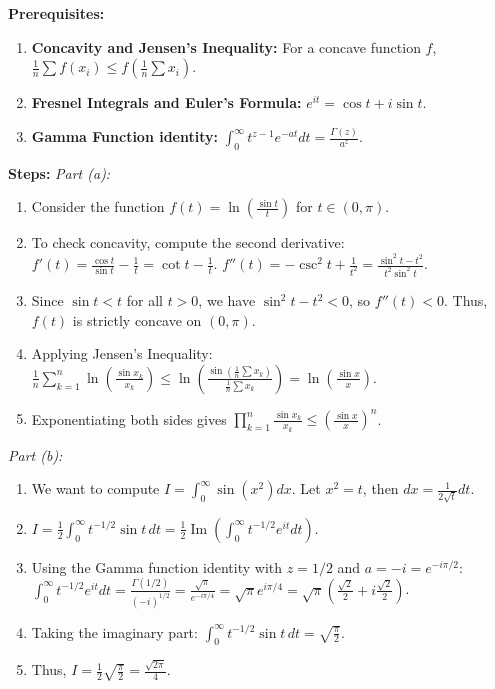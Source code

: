 \begin{solution}
\textbf{Prerequisites:}
\begin{enumerate}
    \item \textbf{Concavity and Jensen's Inequality:} For a concave function $f$, $\frac{1}{n}\sum f(x_i) \leq f(\frac{1}{n}\sum x_i)$.
    \item \textbf{Fresnel Integrals and Euler's Formula:} $e^{it} = \cos t + i\sin t$.
    \item \textbf{Gamma Function identity:} $\int_0^\infty t^{z-1} e^{-at} dt = \frac{\Gamma(z)}{a^z}$.
\end{enumerate}

\textbf{Steps:}
\textit{Part (a):}
\begin{enumerate}
    \item Consider the function $f(t) = \ln\left(\frac{\sin t}{t}\right)$ for $t \in (0, \pi)$.
    \item To check concavity, compute the second derivative:
       $f'(t) = \frac{\cos t}{\sin t} - \frac{1}{t} = \cot t - \frac{1}{t}$.
       $f''(t) = -\csc^2 t + \frac{1}{t^2} = \frac{\sin^2 t - t^2}{t^2 \sin^2 t}$.
    \item Since $\sin t < t$ for all $t > 0$, we have $\sin^2 t - t^2 < 0$, so $f''(t) < 0$. Thus, $f(t)$ is strictly concave on $(0, \pi)$.
    \item Applying Jensen's Inequality:
       $\frac{1}{n} \sum_{k=1}^n \ln\left(\frac{\sin x_k}{x_k}\right) \leq \ln\left(\frac{\sin(\frac{1}{n}\sum x_k)}{\frac{1}{n}\sum x_k}\right) = \ln\left(\frac{\sin x}{x}\right)$.
    \item Exponentiating both sides gives $\prod_{k=1}^n \frac{\sin x_k}{x_k} \leq \left(\frac{\sin x}{x}\right)^n$.
\end{enumerate}

\textit{Part (b):}
\begin{enumerate}
    \item We want to compute $I = \int_0^\infty \sin(x^2) dx$. Let $x^2 = t$, then $dx = \frac{1}{2\sqrt{t}} dt$.
    \item $I = \frac{1}{2} \int_0^\infty t^{-1/2} \sin t \, dt = \frac{1}{2} \operatorname{Im} \left( \int_0^\infty t^{-1/2} e^{it} dt \right)$.
    \item Using the Gamma function identity with $z = 1/2$ and $a = -i = e^{-i\pi/2}$:
       $\int_0^\infty t^{-1/2} e^{it} dt = \frac{\Gamma(1/2)}{(-i)^{1/2}} = \frac{\sqrt{\pi}}{e^{-i\pi/4}} = \sqrt{\pi} e^{i\pi/4} = \sqrt{\pi} \left( \frac{\sqrt{2}}{2} + i \frac{\sqrt{2}}{2} \right)$.
    \item Taking the imaginary part: $\int_0^\infty t^{-1/2} \sin t \, dt = \sqrt{\frac{\pi}{2}}$.
    \item Thus, $I = \frac{1}{2} \sqrt{\frac{\pi}{2}} = \frac{\sqrt{2\pi}}{4}$.
\end{enumerate}


\end{solution}
